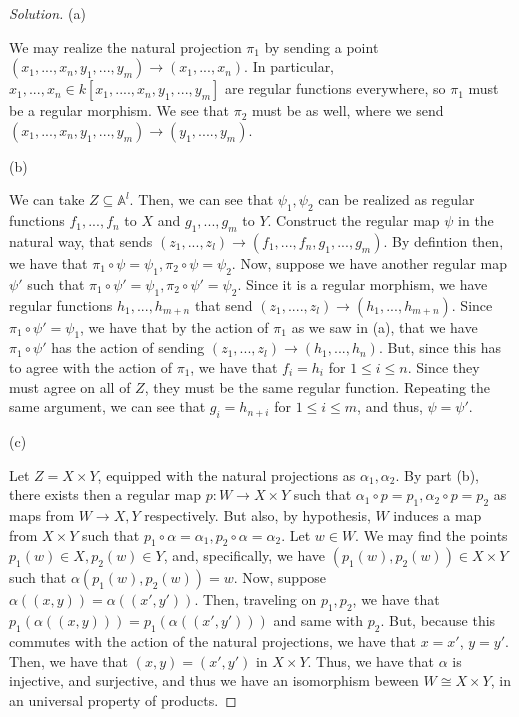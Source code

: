 \documentclass[10pt]{article}
\begin{document}
\begin{proof}[Solution]

(a)

We may realize the natural projection $\pi_1$ by sending a point $(x_1,...,x_n,y_1,...,y_m) \to (x_1,...,x_n)$. In particular, $x_1,...,x_n \in k[x_1,....,x_n,y_1,...,y_m]$ are regular functions everywhere, so $\pi_1$ must be a regular morphism. We see that $\pi_2$ must be as well, where we send $(x_1,...,x_n,y_1,...,y_m) \to (y_1,....,y_m)$.

(b) 

We can take $Z \subseteq \mathbb{A}^l$. Then, we can see that $\psi_1, \psi_2$ can be realized as regular functions $f_1,...,f_n$ to $X$ and $g_1,...,g_m$ to $Y$. Construct the regular map $\psi$ in the natural way, that sends $(z_1,...,z_l) \to (f_1,...,f_n,g_1,...,g_m)$. By defintion then, we have that  $\pi_1 \circ \psi = \psi_1, \pi_2 \circ \psi = \psi_2$. Now, suppose we have another regular map $\psi'$ such that $\pi_1 \circ \psi' = \psi_1, \pi_2 \circ \psi' = \psi_2$. Since it is a regular morphism, we have regular functions $h_1,...,h_{m+n}$ that send $(z_1,....,z_{l}) \to (h_1,...,h_{m+n})$. Since $\pi_1 \circ \psi' = \psi_1$, we have that by the action of $\pi_1$ as we saw in (a), that we have $\pi_1 \circ \psi'$ has the action of sending $(z_1,...,z_{l}) \to (h_1,...,h_n)$. But, since this has to agree with the action of $\pi_1$, we have that $f_i = h_i$ for $1 \leq i \leq n$. Since they must agree on all of $Z$, they must be the same regular function. Repeating the same argument, we can see that $g_i = h_{n + i}$ for $ 1 \leq i \leq m $, and thus, $\psi  = \psi'$.

(c)

Let $Z = X \times Y$, equipped with the natural projections as $\alpha_1, \alpha_2$. By part (b), there exists then a regular map $p: W \to X \times Y$ such that $\alpha_1 \circ p = p_1, \alpha_2 \circ p = p_2$ as maps from $W \to X, Y$ respectively. But also, by hypothesis, $W$ induces a map from $X \times Y$ such that $p_1 \circ \alpha = \alpha_1, p_2 \circ \alpha = \alpha_2$. Let $w \in W$. We may find the points $p_1(w) \in X, p_2(w) \in Y$, and, specifically, we have $(p_1(w),p_2(w)) \in X \times Y$ such that $\alpha(p_1(w),p_2(w)) = w$. Now, suppose $\alpha((x,y)) = \alpha((x',y'))$. Then, traveling on $p_1,p_2$, we have that $p_1(\alpha((x,y))) = p_1(\alpha((x',y')))$ and same with $p_2$. But, because this commutes with the action of the natural projections, we have that $x = x'$, $y = y'$. Then, we have that $(x,y) = (x',y')$ in $X \times Y$. Thus, we have that $\alpha$ is injective, and surjective, and thus we have an isomorphism beween $W \cong X \times Y$, in an universal property of products. 

\end{proof}
\end{document}
